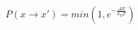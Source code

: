 \begin{equation}
P(x \rightarrow x') = min\left(1,e^{-\frac{{\Delta}E}{k_{B}T}}\right)
\end{equation}
